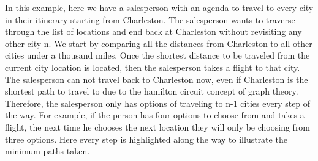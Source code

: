 \documentclass[a4paper,11pt]{scrartcl}
\begin{document}
In this example, here we have a salesperson with an agenda to travel to every city in their itinerary starting from Charleston. The salesperson wants to traverse through the list of locations and end back at Charleston without revisiting any other city n. We start by comparing all the distances from Charleston to all other cities under a thousand miles. Once the shortest distance to be traveled from the current city location is located, then the salesperson takes a flight to that city. The salesperson can not travel back to Charleston now, even if Charleston is the shortest path to travel to due to the hamilton circuit concept of graph theory. Therefore, the salesperson only has options of traveling to n-1 cities every step of the way. For example, if the person has four options to choose from and takes a flight, the next time he chooses the next location they will only be choosing from three options. Here every step is highlighted along the way to illustrate the minimum paths taken.
\end{document}

